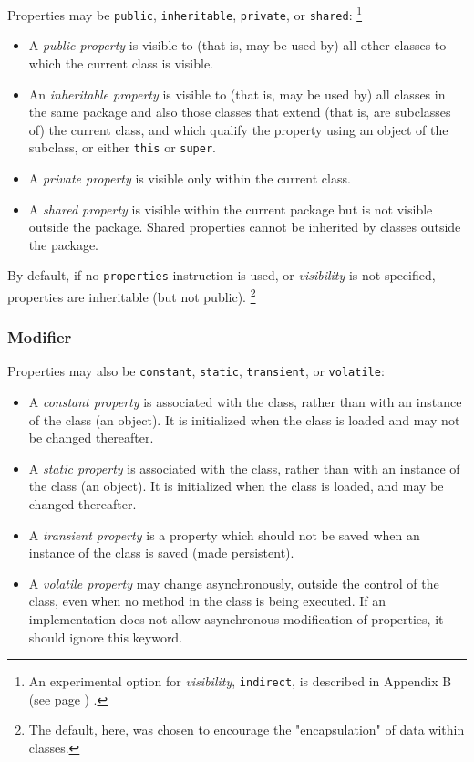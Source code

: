 Properties may be \texttt{public}, \texttt{inheritable},
\texttt{private}, or \texttt{shared}:
\footnote{
An experimental option for \emph{visibility}, \texttt{indirect},
is described in  Appendix B (see page \pageref{refappb}) .
}
\begin{itemize}
\item A \emph{public property} is visible to (that is, may be used by)
all other classes to which the current class is visible.
\item An \emph{inheritable property} is visible to (that is, may be used
by) all classes in the same package and also those classes that extend
(that is, are subclasses of) the current class, and which qualify the
property using an object of the subclass, or either \texttt{this}
or \texttt{super}.
\item A \emph{private property} is visible only within the current
class.
\item 
A \emph{shared property} is visible within the current package
but is not visible outside the package.  Shared properties cannot be
inherited by classes outside the package.
\end{itemize}
 
By default, if no \texttt{properties} instruction is used,
or \emph{visibility} is not specified, properties
are inheritable (but not public).
\footnote{
The default, here, was chosen to encourage the "encapsulation" of
data within classes.
}
\subsubsection{Modifier}\label{refpropmod}
 
Properties may also be \texttt{constant}, \texttt{static},
\texttt{transient}, or \texttt{volatile}:
\begin{itemize}
\item 
A \emph{constant property} is associated with the class, rather
than with an instance of the class (an object).
It is initialized when the class is loaded and may not be changed
thereafter.
\item 
A \emph{static property} is associated with the class, rather
than with an instance of the class (an object).
It is initialized when the class is loaded, and may be changed
thereafter.
\item 
A \emph{transient property} is a property which should not be saved when
an instance of the class is saved (made persistent).
\item 
A \emph{volatile property} may change asynchronously, outside the
control of the class, even when no method in the class is being
executed.
If an implementation does not allow asynchronous modification of
properties, it should ignore this keyword.
\end{itemize}
 
